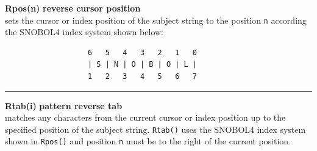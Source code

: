 \documentclass[letterpaper,12pt]{article}
\begin{document}
\noindent\textbf{Rpos(n)} \hfill\textbf{reverse cursor position}\\
sets the cursor or index position of the subject string to the
position \texttt{n} according the SNOBOL4 index system shown below:
\begin{verbatim}
                   6   5   4   3   2   1   0
                   | S | N | O | B | O | L |
                   1   2   3   4   5   6   7
\end{verbatim}
\noindent\rule{16.5cm}{0.1pt}

\noindent\textbf{Rtab(i)} \hfill\textbf{pattern reverse tab}\\
matches any characters from the current cursor or index position up to
the specified position of the subject string.  \texttt{Rtab()} uses
the SNOBOL4 index system shown in \texttt{Rpos()} and position
\texttt{n} must be to the right of the current position.\\



\end{document}
